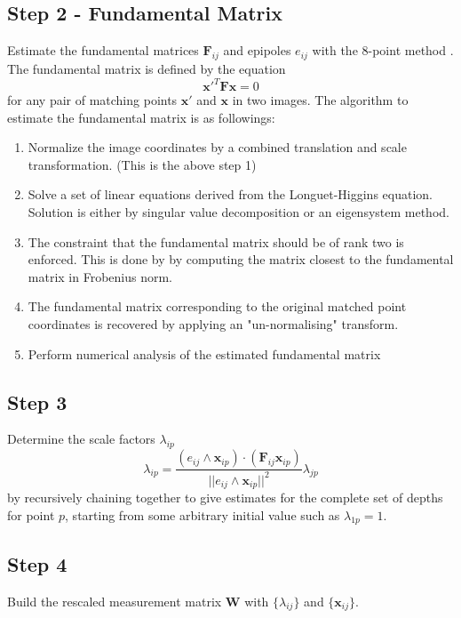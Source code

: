 \subsection{Step 2 - Fundamental Matrix}

Estimate the fundamental matrices $ \textbf{F}_{ij} $ and epipoles $ e_{ij} $ with the 8-point method \cite{Hartley}\cite{Butterfield}. The fundamental matrix is defined by the equation
$$ \textbf{x}'^T \textbf{F} \textbf{x} = 0 $$
for any pair of matching points $ \textbf{x}' $ and $ \textbf{x} $ in two images. 
The algorithm  to estimate the fundamental matrix is as followings: 

\begin{enumerate}
\item Normalize the image coordinates by a combined translation and scale transformation. (This is the above step 1)
\item Solve a set of linear equations derived from the Longuet-Higgins equation. Solution is either by singular value decomposition or an eigensystem method. 
\item The constraint that the fundamental matrix should be of rank two is enforced. This is done by by computing the matrix closest to the fundamental matrix in Frobenius norm.
\item The fundamental matrix corresponding to the original matched point coordinates is recovered by applying an "un-normalising" transform. 
\item Perform numerical analysis of the estimated fundamental matrix
\end{enumerate}

\subsection{Step 3}

Determine the scale factors $ \lambda_{ip} $
$$ \lambda_{ip} = \frac{ (e_{ij} \wedge \textbf{x}_{ip} ) \cdot (\textbf{F}_{ij} \textbf{x}_{ip} ) }
{ || e_{ij} \wedge \textbf{x}_{ip} ||^2} \lambda_{jp} $$
by recursively chaining together to give estimates for the complete set of depths for point $p$, starting from some arbitrary initial value such as $ \lambda_{1p} = 1. $

\subsection{Step 4}

Build the rescaled measurement matrix $ \textbf{W}$ with $ \{\lambda_{ij}\} $ and $ \{\textbf{x}_{ij}\}. $

